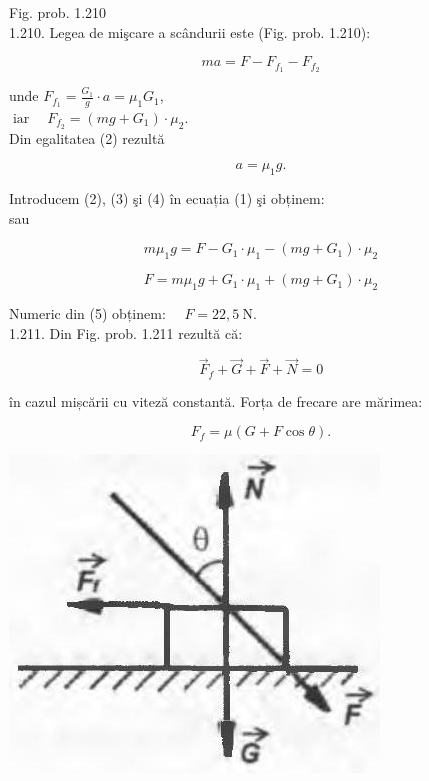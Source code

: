 \documentclass[10pt]{article}
\begin{document}
Fig. prob. 1.210\\
1.210. Legea de mişcare a scândurii este (Fig. prob. 1.210):


\begin{equation*}
m a=F-F_{f_{1}}-F_{f_{2}} \tag{1}
\end{equation*}


unde $F_{f_{1}}=\frac{G_{1}}{g} \cdot a=\mu_{1} G_{1}$,\\
$\operatorname{iar} \quad F_{f_{2}}=\left(m g+G_{1}\right) \cdot \mu_{2}$.\\
Din egalitatea (2) rezultă


\begin{equation*}
a=\mu_{1} g . \tag{4}
\end{equation*}


Introducem (2), (3) şi (4) în ecuația (1) şi obținem:\\
sau

$$
m \mu_{1} g=F-G_{1} \cdot \mu_{1}-\left(m g+G_{1}\right) \cdot \mu_{2}
$$


\begin{equation*}
F=m \mu_{1} g+G_{1} \cdot \mu_{1}+\left(m g+G_{1}\right) \cdot \mu_{2} \tag{5}
\end{equation*}


Numeric din (5) obținem: $\quad F=22,5 \mathrm{~N}$.\\
1.211. Din Fig. prob. 1.211 rezultă că:


\begin{equation*}
\vec{F}_{f}+\vec{G}+\vec{F}+\vec{N}=0 \tag{1}
\end{equation*}


în cazul mișcării cu viteză constantă. Forța de frecare are mărimea:


\begin{equation*}
F_{f}=\mu(G+F \cos \theta) . \tag{2}
\end{equation*}


\begin{center}
\includegraphics[max width=\textwidth]{2025_07_01_5b3ff9fa0d508c8e9f17g-244}
\end{center}
\end{document}
